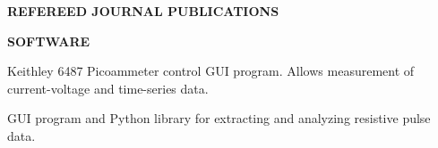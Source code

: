 {  
\pagebreak

\textbf{REFEREED JOURNAL PUBLICATIONS}


% 

\vspace{12pt}
\textbf{SOFTWARE}

  {Keithley 6487 Picoammeter control GUI program. Allows measurement of current-voltage and time-series data.}
  
  {GUI program and Python library for extracting and analyzing resistive pulse data.}
  
  
}

